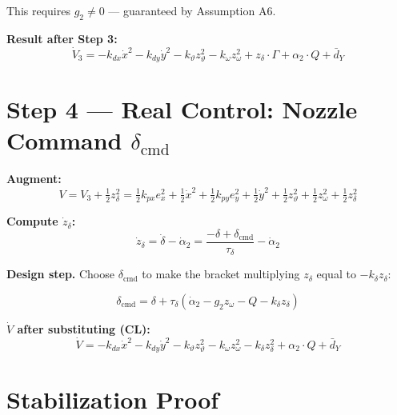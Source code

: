 \documentclass[11pt,a4paper]{article}
\theoremstyle{plain}
\theoremstyle{remark}
\newcommand{\vth}{\vartheta}
\newcommand{\zth}{z_{\vth}}
\newcommand{\zom}{z_{\omega}}
\newcommand{\zdel}{z_{\delta}}
\newcommand{\dcmd}{\delta_{\mathrm{cmd}}}
\begin{document}
This requires $g_2 \neq 0$ --- guaranteed by Assumption A6.

\textbf{Result after Step 3:}
\begin{equation}
  \dot V_3 = -k_{dx}\dot x^2 - k_{dy}\dot y^2 - k_\vth \zth^2 - k_\omega\zom^2 + \zdel\cdot\Gamma + \alpha_2\cdot Q + \bar{d}_Y
  \tag{DV3'}
\end{equation}

\section{Step 4 --- Real Control: Nozzle Command \texorpdfstring{$\delta_{\mathrm{cmd}}$}{delta\_cmd}}

\textbf{Augment:}
\begin{equation}
  V = V_3 + \tfrac{1}{2}\zdel^2
  = \tfrac{1}{2}k_{px}e_x^2 + \tfrac{1}{2}\dot x^2 + \tfrac{1}{2}k_{py}e_y^2 + \tfrac{1}{2}\dot y^2 + \tfrac{1}{2}\zth^2 + \tfrac{1}{2}\zom^2 + \tfrac{1}{2}\zdel^2
  \tag{V4}
\end{equation}

\textbf{Compute $\dot\zdel$:}
\begin{equation}
  \dot\zdel = \dot\delta - \dot\alpha_2 = \frac{-\delta + \dcmd}{\tau_\delta} - \dot\alpha_2
  \tag{D4}
\end{equation}

\textbf{Design step.} Choose $\dcmd$ to make the bracket multiplying $\zdel$ equal to $-k_\delta\zdel$:

\begin{equation}
  \boxed{\dcmd = \delta + \tau_\delta\!\left(\dot\alpha_2 - g_2\zom - Q - k_\delta\zdel\right)}
  \tag{CL}
\end{equation}

\textbf{$\dot V$ after substituting (CL):}
\begin{equation}
  \dot V = -k_{dx}\dot x^2 - k_{dy}\dot y^2 - k_\vth \zth^2 - k_\omega\zom^2 - k_\delta\zdel^2 + \alpha_2\cdot Q + \bar{d}_Y
  \tag{ISS1}
\end{equation}

\section{Stabilization Proof}
\end{document}
